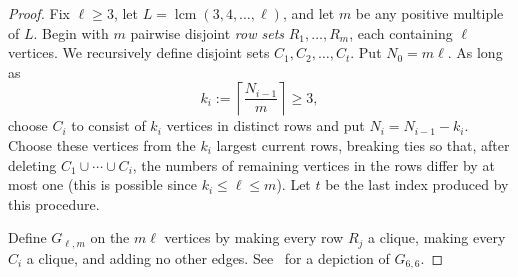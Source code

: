 \documentclass[10pt,a4paper]{amsart}
\begin{document}
\begin{proof}
Fix $\ell\geq 3$, let
$L=\operatorname{lcm}(3,4,\ldots,\ell)$, and let $m$ be any positive
multiple of $L$. Begin with $m$ pairwise disjoint
\emph{row sets} $R_1,\ldots,R_m$, each containing $\ell$ vertices.
We recursively define disjoint sets $C_1,C_2,\ldots,C_t$. Put
$N_0=m\ell$. As long as
\[
   k_i:=\left\lceil\frac{N_{i-1}}{m}\right\rceil\geq 3,
\]
choose $C_i$ to consist of $k_i$ vertices in distinct rows and put
$N_i=N_{i-1}-k_i$. Choose these vertices from the $k_i$ largest current rows, breaking ties so that, after deleting
$C_1\cup\cdots\cup C_i$, the numbers of remaining vertices in the
rows differ by at most one (this is possible since $k_i\leq\ell
\leq m$). Let $t$ be the last index produced by this procedure.

Define $G_{\ell,m}$ on the $m\ell$ vertices by making every row
$R_j$ a clique, making every $C_i$ a clique, and adding no other
edges. See~ for a depiction of $G_{6,6}$.

        


\end{proof}
\end{document}

